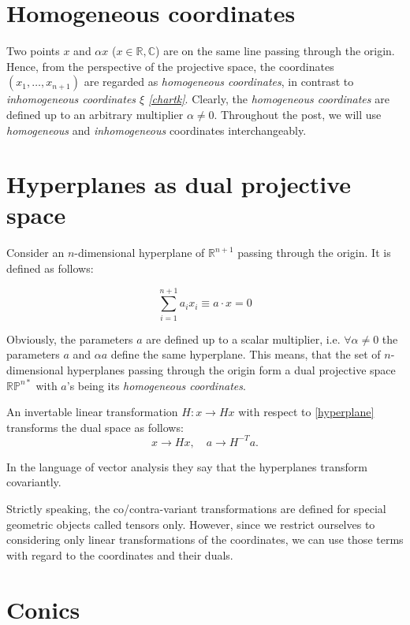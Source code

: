 \documentclass[a4paper,10pt]{article}
\begin{document}
\section{Homogeneous coordinates}

Two points $x$ and $\alpha x$  ($x \in \mathbb{R},\mathbb{C}$) are on the same line passing through the origin. Hence, from the perspective of the projective space, the coordinates $(x_1, \ldots, x_{n+1})$ are regarded as {\it homogeneous coordinates}, in contrast to {\it inhomogeneous coordinates $\xi$ \eqref{chartk}}. Clearly, the {\it homogeneous coordinates} are defined up to an arbitrary multiplier $\alpha \neq 0$. Throughout the post, we will use {\it homogeneous}  and {\it inhomogeneous} coordinates interchangeably.

\section{Hyperplanes as dual projective space}

Consider an $n$-dimensional hyperplane of $\mathbb{R}^{n+1}$ passing through the origin. It is defined as follows:

\begin{equation}
 \sum\limits_{i=1}^{n+1} a_i x_i \equiv a\cdot x = 0\label{hyperplane}
\end{equation}

Obviously, the parameters $a$ are defined up to a scalar multiplier, i.e. $\forall\alpha\neq 0$ the parameters $a$ and $\alpha a$ define the same hyperplane. This means, that the set of $n$-dimensional hyperplanes passing through the origin form a dual projective space $\mathbb{RP}^{n*}$ with $a$'s being its {\it homogeneous coordinates}. 

An invertable linear transformation $H: x \to H x$ with respect to \eqref{hyperplane} transforms the dual space as follows:
\begin{equation}
 x\to Hx, \quad a\to H^{-T} a.
\end{equation}

In the language of vector analysis they say that the hyperplanes transform covariantly.

{\tiny Strictly speaking, the co/contra-variant transformations are defined for special geometric objects called tensors only. However, since we restrict ourselves to considering only linear transformations of the coordinates, we can use those terms with regard to the coordinates and their duals. }

\section{Conics}
\end{document}
